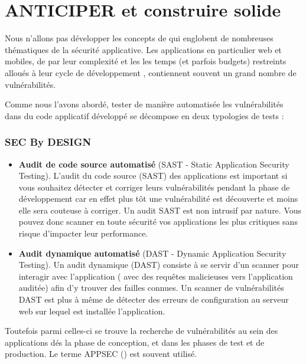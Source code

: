 
\section{ANTICIPER et construire solide}

Nous n'allons pas développer les concepts de  qui  englobent de nombreuses thématiques de la sécurité applicative.
Les applications en particulier web et mobiles, de par leur complexité et les les temps (et parfois budgets) restreints alloués à leur cycle de développement , contiennent souvent un grand nombre de vulnérabilités.

Comme nous l'avons abordé, tester de manière automatisée les vulnérabilités dans du code applicatif développé se décompose en deux typologies de tests :

\begin{frame}
\frametitle<presentation>{SEC By DESIGN}
\begin{itemize}
  \item  \textbf{Audit de code source automatisé} (SAST - Static Application Security Testing). L’audit du code source (SAST) des applications est important si vous souhaitez détecter et corriger leurs vulnérabilités pendant la phase de développement car en effet plus tôt une vulnérabilité est découverte et moins elle sera couteuse à corriger.
Un audit SAST est non intrusif par nature. Vous pouvez donc scanner en toute sécurité vos applications les plus critiques sans risque d’impacter leur performance.
  \item   \textbf{Audit dynamique automatisé }(DAST - Dynamic Application Security Testing). Un audit dynamique (DAST) consiste à se servir d’un scanner pour interagir avec l’application ( avec des requêtes malicieuses vers l’application auditée)  afin d’y trouver des failles connues.
Un scanner de vulnérabilités DAST est plus à même de détecter des erreurs de configuration au serveur web sur lequel est installée l’application.

\end{itemize}
\end{frame}

Toutefois parmi celles-ci se trouve la recherche de vulnérabilités au sein des applications dés la phase de conception, et dans les phases de test et de production. Le terme APPSEC () est souvent utilisé.



